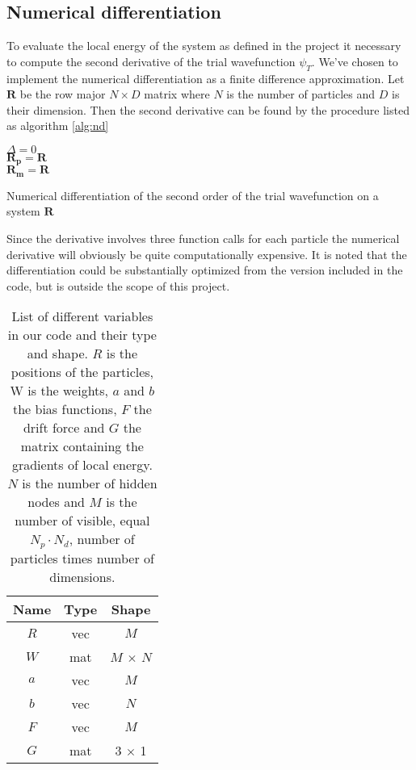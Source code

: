 \subsection{Numerical differentiation}
To evaluate the local energy of the system as defined in the project it necessary to compute the second derivative of the trial wavefunction $\psi_T$. We've chosen to implement the numerical differentiation as a finite difference approximation. Let $\mathbf{R}$ be the row major $N \times D$ matrix where $N$ is the number of particles and $D$ is their dimension. Then the second derivative can be found by the procedure listed as algorithm \ref{alg:nd}

\begin{algorithm}
\BlankLine
$\Delta = 0$ \\
$\mathbf{R_p} = \mathbf{R}$\\
$\mathbf{R_m} = \mathbf{R}$\\
\BlankLine
{}
\BlankLine
\caption{Numerical differentiation of the second order of the trial wavefunction on a system $\mathbf{R}$}\label{alg:nd}
\end{algorithm} 

Since the derivative involves three function calls for each particle the numerical derivative will obviously be quite computationally expensive. It is noted  that the differentiation could be substantially optimized from the version included in the code, but is outside the scope of this project. 

\begin{table}
    \centering
    \begin{tabular}{|c|c|c|}
    \hline
    Name   &  Type   &   Shape \\
    \hline
    $R$ & vec & $M$ \\
    $W$ & mat & $M$ $\times$ $N$ \\
    $a$ & vec & $M$ \\
    $b$ & vec & $N$ \\
    $F$ & vec & $M$ \\
    $G$ & mat & 3 $\times$ 1 \\
    \hline
    \end{tabular}
    \caption{List of different variables in our code and their type and shape. $R$ is the positions of the particles, W is the weights, $a$ and $b$ the bias functions, $F$ the drift force and $G$ the matrix containing the gradients of local energy. $N$ is the number of hidden nodes and $M$ is the number of visible, equal $N_p \cdot N_d$, number of particles times number of dimensions.}
    \label{tab:variables}
\end{table} 
